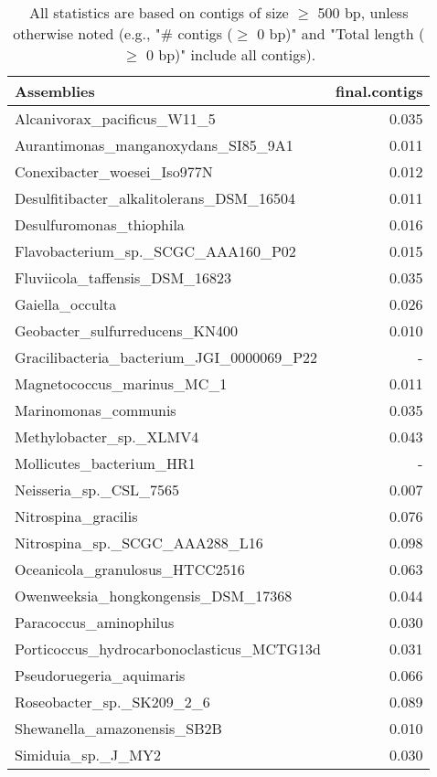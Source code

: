\documentclass[12pt,a4paper]{article}
\begin{document}
\begin{table}[ht]
\begin{center}
\caption{All statistics are based on contigs of size $\geq$ 500 bp, unless otherwise noted (e.g., "\# contigs ($\geq$ 0 bp)" and "Total length ($\geq$ 0 bp)" include all contigs).}
\begin{tabular}{|l*{1}{|r}|}
\hline
Assemblies & final.contigs \\ \hline
Alcanivorax\_pacificus\_W11\_5 & 0.035 \\ \hline
Aurantimonas\_manganoxydans\_SI85\_9A1 & 0.011 \\ \hline
Conexibacter\_woesei\_Iso977N & 0.012 \\ \hline
Desulfitibacter\_alkalitolerans\_DSM\_16504 & 0.011 \\ \hline
Desulfuromonas\_thiophila & 0.016 \\ \hline
Flavobacterium\_sp.\_SCGC\_AAA160\_P02 & 0.015 \\ \hline
Fluviicola\_taffensis\_DSM\_16823 & 0.035 \\ \hline
Gaiella\_occulta & 0.026 \\ \hline
Geobacter\_sulfurreducens\_KN400 & 0.010 \\ \hline
Gracilibacteria\_bacterium\_JGI\_0000069\_P22 & - \\ \hline
Magnetococcus\_marinus\_MC\_1 & 0.011 \\ \hline
Marinomonas\_communis & 0.035 \\ \hline
Methylobacter\_sp.\_XLMV4 & 0.043 \\ \hline
Mollicutes\_bacterium\_HR1 & - \\ \hline
Neisseria\_sp.\_CSL\_7565 & 0.007 \\ \hline
Nitrospina\_gracilis & 0.076 \\ \hline
Nitrospina\_sp.\_SCGC\_AAA288\_L16 & 0.098 \\ \hline
Oceanicola\_granulosus\_HTCC2516 & 0.063 \\ \hline
Owenweeksia\_hongkongensis\_DSM\_17368 & 0.044 \\ \hline
Paracoccus\_aminophilus & 0.030 \\ \hline
Porticoccus\_hydrocarbonoclasticus\_MCTG13d & 0.031 \\ \hline
Pseudoruegeria\_aquimaris & 0.066 \\ \hline
Roseobacter\_sp.\_SK209\_2\_6 & 0.089 \\ \hline
Shewanella\_amazonensis\_SB2B & 0.010 \\ \hline
Simiduia\_sp.\_J\_MY2 & 0.030 \\ \hline

\end{tabular}
\end{center}
\end{table}
\end{document}
